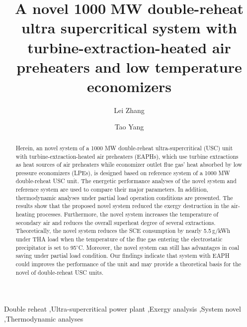 \documentclass[preprint,12pt]{elsarticle}
\begin{document}
\begin{frontmatter}



\title{A novel 1000\,\,MW double-reheat ultra supercritical system with turbine-extraction-heated air preheaters and low temperature economizers}


\author[hust,ncst]{Lei Zhang}
\author[hust]{Tao Yang}

\address[hust]{School of Energy and Power Engineering, Huazhong University of Science and Technology, Wuhan 430074,China}
\address[ncst]{College of Metallurgy and Energy, NorthChina University of Scienceand and Technology, Tangshan 063009,China}

\begin{abstract}
Herein, an novel system of a 1000\,\,MW double-reheat ultra-supercritical (USC) unit with turbine-extraction-heated air preheaters (EAPHs), which use turbine extractions as heat sources of air preheaters while economizer outlet flue gas’ heat absorbed by low pressure economizers (LPEs), is designed based on reference system of a 1000\,\,MW double-reheat USC unit. 
The energetic performance analyses of the novel system and reference system are used to compare their major parameters. 
In addition, thermodynamic analyses under partial load operation conditions are presented. 
The results show that the proposed novel system reduced the exergy destruction in the air-heating processes. Furthermore, the novel system increases the temperature of secondary air and reduces the overall superheat degree of several extractions.
 Theoretically, the novel system reduces the SCE consumption by nearly 5.5\,g/kWh under THA load when the temperature of the flue gas entering the electrostatic precipitator is set to 95$^\circ$C.
 Moreover, the novel system can still has advantages in coal saving under partial load condition.
 Our findings indicate that system with EAPH could improves the performance of the unit and may provide a theoretical basis for the novel of double-reheat USC units.
\end{abstract}

\begin{keyword}
Double reheat \sep Ultra-supercritical power plant \sep Exergy analysis \sep System novel \sep Thermodynamic analyses
\end{keyword}

\end{frontmatter}
\end{document}
